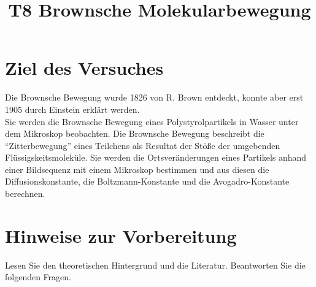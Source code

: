 \documentclass[a4paper, 12pt]{scrartcl}
\title{T8 Brownsche Molekularbewegung}
\begin{document}
\let\endtitlepage\relax
{}

\section*{Ziel des Versuches}

Die Brownsche Bewegung wurde 1826 von R. Brown entdeckt, konnte aber erst 1905 durch Einstein erklärt werden.\\
Sie werden die Brownsche Bewegung eines Polystyrolpartikels in Wasser unter dem Mikroskop beobachten. Die Brownsche Bewegung beschreibt die ``Zitterbewegung'' eines Teilchens als Resultat der Stöße der umgebenden Flüssigskeitsmoleküle. Sie werden  die Ortsveränderungen eines Partikels anhand einer Bildsequenz mit einem Mikroskop bestimmen und aus diesen die Diffusionskonstante, die Boltzmann-Konstante und die Avogadro-Konstante berechnen.


\section*{Hinweise zur Vorbereitung}
Lesen Sie den theoretischen Hintergrund und die Literatur. Beantworten Sie die folgenden Fragen.
\end{document}

